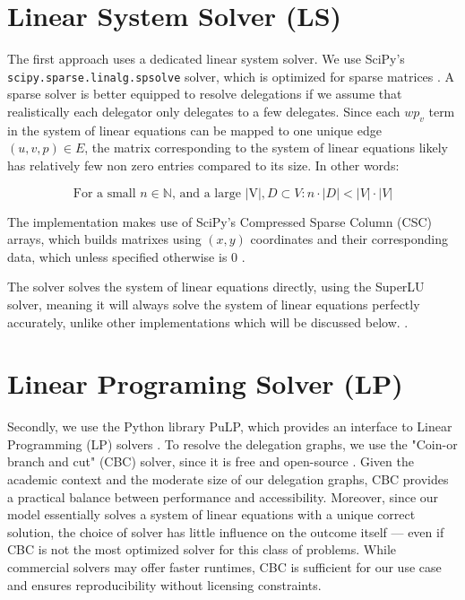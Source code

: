 \section{Linear System Solver (LS)}

The first approach uses a dedicated linear system solver. We use SciPy's \texttt{scipy.sparse.linalg.spsolve} solver, which is optimized for sparse matrices \cite{virtanenSciPy10Fundamental2020}. A sparse solver is better equipped to resolve delegations if we assume that realistically each delegator only delegates to a few delegates. Since each $wp_v$ term in the system of linear equations can be mapped to one unique edge $(u, v, p) \in E$, the matrix corresponding to the system of linear equations likely has relatively few non zero entries compared to its size. In other words:

\[
\text{For a small } n \in \mathbb{N} \text{, and a large |V|}, D \subset V: n \cdot |D| < |V| \cdot |V|
\]

 
 The implementation makes use of SciPy's Compressed Sparse Column (CSC) arrays, which builds matrixes using $(x,y)$ coordinates and their corresponding data, which unless specified otherwise is 0 \cite{virtanenSciPy10Fundamental2020}. 

The solver solves the system of linear equations directly, using the SuperLU solver, meaning it will always solve the system of linear equations perfectly accurately, unlike other implementations which will be discussed below. \cite{liSuperLUUsersGuide1999}. 

\section{Linear Programing Solver (LP)}

Secondly, we use the Python library PuLP, which provides an interface to Linear Programming (LP) solvers \cite{osullivanPuLPLinearProgramming2011}. To resolve the delegation graphs, we use the "Coin-or branch and cut" (CBC) solver, since it is free and open-source \cite{johnforrestCoinorCbcRelease2024}. Given the academic context and the moderate size of our delegation graphs, CBC provides a practical balance between performance and accessibility. Moreover, since our model essentially solves a system of linear equations with a unique correct solution, the choice of solver has little influence on the outcome itself — even if CBC is not the most optimized solver for this class of problems. While commercial solvers may offer faster runtimes, CBC is sufficient for our use case and ensures reproducibility without licensing constraints.

